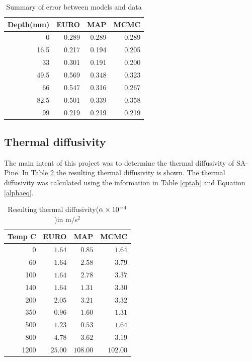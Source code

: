 \begin{table}[H] \label{errortab}
\centering
\caption{Summary of error between models and data}
	\begin{tabular}{ r r r r }
	\toprule
	Depth(mm) & EURO & MAP & MCMC\\
	\midrule
	0 & 0.289 & 0.289 & 0.289\\
	16.5 & 0.217 & \cellcolor{green!20}0.194 & 0.205\\
	33 & 0.301   & \cellcolor{green!20} 0.191 & 0.200\\
	49.5 & 0.569 & 0.348 &\cellcolor{green!20} 0.323\\
	66 & 0.547   & 0.316 & \cellcolor{green!20}0.267\\
	82.5 & 0.501 &\cellcolor{green!20} 0.339 & 0.358\\
	99 & 0.219   & 0.219 &\cellcolor{green!20} 0.219\\
	\bottomrule	
	\end{tabular}
	
\end{table}

\subsection{Thermal diffusivity}
The main intent of this project was to determine the thermal diffusivity of SA-Pine. 
In Table \ref{diffrestab} the resulting thermal diffusivity is shown.
The thermal diffusivity was calculated using the information in Table \ref{cptab} and Equation \ref{alphaeq}.

\begin{table}[H] \label{diffrestab}
\centering
	\caption{Resulting thermal diffusivity($\alpha \times 10^{-4}$)in m/s$^2$ }
	\begin{tabular}{ r r r r }
	\toprule
	Temp \textdegree C & EURO & MAP & MCMC\\
	\midrule
	0&   $1.64$&	$0.85$&	$1.64$\\
	60&  $1.64$&	$2.58$&	$3.79$\\
	100& $1.64$&	$2.78$&	$3.37$\\\
	140& $1.64$&	$1.31$&	$3.30$\\
	200& $2.05$&	$3.21$&	$3.32$\\
	350& $0.96$&	$1.60$&	$1.31$\\
	500& $1.23$&	$0.53$&	$1.64$\\
	800& $4.78$&	$3.62$&	$3.19$\\
	1200& $25.00$&	$108.00$&	$102.00$\\
	\bottomrule	
	\end{tabular}
	
\end{table}

